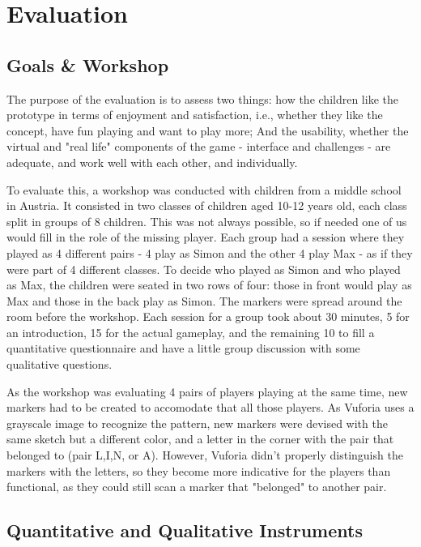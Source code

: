 \section{Evaluation}
\label{sec:resul}

\subsection{Goals \& Workshop}
\par The purpose of the evaluation is to assess two things: how the children like the prototype in terms of enjoyment and satisfaction, i.e., whether they like the concept, have fun playing and want to play more; And the usability, whether the virtual and "real life" components of the game - interface and challenges - are adequate, and work well with each other, and individually.
\par To evaluate this, a workshop was conducted with children from a middle school in Austria. It consisted in two classes of children aged 10-12 years old, each class split in groups of 8 children. This was not always possible, so if needed one of us would fill in the role of the missing player. Each group had a session where they played as 4 different pairs - 4 play as Simon and the other 4 play Max - as if they were part of 4 different classes.  To decide who played as Simon and who played as Max, the children were seated in two rows of four: those in front would play as Max and those in the back play as Simon.
The markers were spread around the room before the workshop. Each session for a group took about 30 minutes, 5 for an introduction, 15 for the actual gameplay, and the remaining 10 to fill a quantitative questionnaire and have a little group discussion with some qualitative questions.
\par As the workshop was evaluating 4 pairs of players playing at the same time, new markers had to be created to accomodate that all those players. As Vuforia uses a grayscale image to recognize the pattern, new markers were devised with the same sketch but a different color, and a letter in the corner with the pair that belonged to (pair L,I,N, or A). However, Vuforia didn't properly distinguish the markers with the letters, so they become more indicative for the players than functional, as they could still scan a marker that "belonged" to another pair.

\subsection{Quantitative and Qualitative Instruments}

